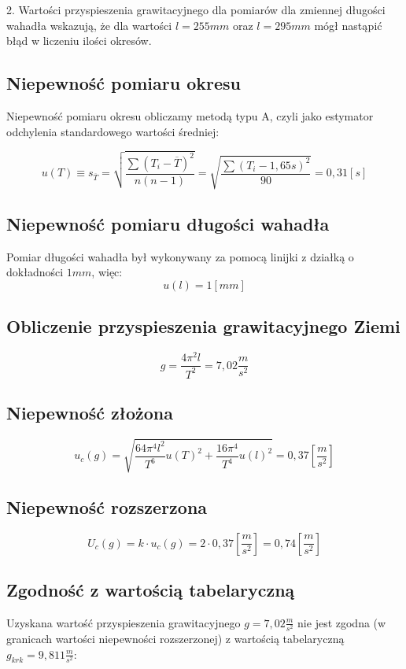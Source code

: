 \documentclass[a4paper,10pt,twoside]{article}
\begin{document}
2. Wartości przyspieszenia grawitacyjnego dla pomiarów dla zmiennej długości wahadła wskazują, że dla wartości $l=255 \unit{mm}$ oraz $l=295 \unit{mm}$ mógł nastąpić błąd w liczeniu ilości okresów.

\subsection{Niepewność pomiaru okresu}

Niepewność pomiaru okresu obliczamy metodą typu A, czyli jako estymator odchylenia standardowego wartości średniej:

$$u(T)\equiv s_{\overline{T}} = \sqrt{\frac{\sum{(T_i-\overline{T})^2}}{n(n-1)}} = \sqrt{\frac{\sum{(T_i-1,65 \unit{s})^2}}{90}} = 0,31 \unit{[s]} $$

\subsection{Niepewność pomiaru długości wahadła}
Pomiar długości wahadła był wykonywany za pomocą linijki z działką o dokładności $1 \unit{mm}$, więc:
$$u(l)=1 \unit{[mm]}$$

\subsection{Obliczenie przyspieszenia grawitacyjnego Ziemi}

$$g = \frac{4\pi^2l}{T^2} = 7,02 \unit{\frac{m}{s^2}}$$

\subsection{Niepewność złożona}

$$u_c(g)=\sqrt{\frac{64\pi^4 l^2}{T^6}u(T)^2+\frac{16\pi^4}{T^4}u(l)^2} =  0,37 \unit{[\frac{m}{s^2}]}$$

\subsection{Niepewność rozszerzona}

$$U_c(g) = k \cdot u_c(g) = 2 \cdot 0,37 [\frac{m}{s^2}] = 0,74 \unit{[\frac{m}{s^2}]}$$

\subsection{Zgodność z wartością tabelaryczną}

Uzyskana wartość przyspieszenia grawitacyjnego $g = 7,02 \unit{\frac{m}{s^2}}$ nie jest zgodna (w granicach wartości niepewności rozszerzonej) z wartością tabelaryczną $g_{krk} = 9,811 \unit{\frac{m}{s^2}}$:
\end{document}
